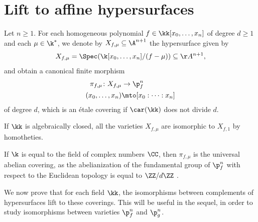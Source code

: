 \section{Lift to affine hypersurfaces}
Let $n\geq 1$. For each homogeneous polynomial $f\in \kk[x_0,\ldots,x_n]$ of degree $d\ge 1$ and each $\mu\in \k^*$, we denote by $X_{f,\mu}\subseteq \A^{n+1}$ the hypersurface given by
\[
X_{f,\mu}=\Spec(\k[x_0,\ldots,x_n]/(f-\mu)) \subseteq \AA^{n+1},
\]
and obtain a canonical finite morphism
\begin{align*}
\pi_{f,\mu}\colon X_{f, \mu}&\to \p^n_f\\
(x_0,\ldots,x_n)&\mto [x_0:\cdots:x_n]
\end{align*}
of degree $d$, which is an étale covering if $\car(\kk)$ does not divide $d$.

If $\kk$ is algebraically closed, all the varieties $X_{f,\mu}$ are isomorphic to $X_{f,1}$ by homotheties.

If $\k$ is equal to the field of complex numbers $\CC$, then $\pi_{f,\mu}$
is the universal abelian covering, as the abelianization of the
fundamental group of $\p^n_f$ with respect to the Euclidean topology is equal to $\ZZ / d \ZZ$ \cite[Prop.\,2.3]{Li2005Lectures-on-topolo}.

We now prove that for each field $\kk$, the isomorphisms between complements of hypersurfaces lift to these coverings. This will be useful in the sequel, in order to study isomorphisms between varieties $\p^n_f$ and $\p^n_g$.

